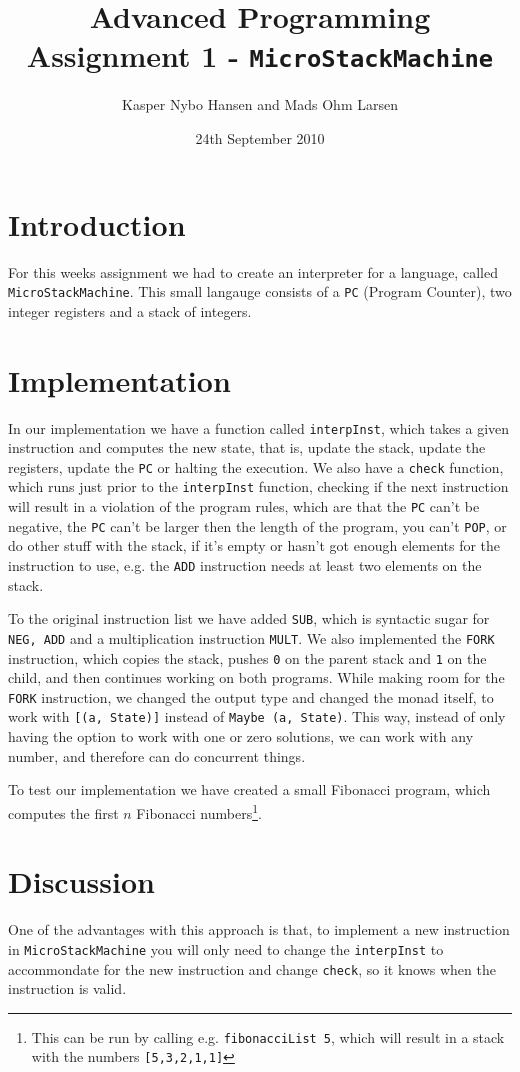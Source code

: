 \documentclass[10pt, a4paper]{article}
\title{Advanced Programming \\\small{Assignment 1} - \texttt{MicroStackMachine}}
\author{Kasper Nybo Hansen and Mads Ohm Larsen}
\date{24th September 2010}
\begin{document}
	
\maketitle
\section{Introduction}
For this weeks assignment we had to create an interpreter for a language, called \texttt{MicroStackMachine}.
This small langauge consists of a \texttt{PC} (Program Counter), two integer registers and a stack of integers.

\section{Implementation}
In our implementation we have a function called \texttt{interpInst}, which takes a given instruction and computes the new state, that is, update the stack, update the registers, update the \texttt{PC} or halting the execution.
We also have a \texttt{check} function, which runs just prior to the \texttt{interpInst} function, checking if the next instruction will result in a violation of the program rules, which are that the \texttt{PC} can't be negative, the \texttt{PC} can't be larger then the length of the program, you can't \texttt{POP}, or do other stuff with the stack, if it's empty or hasn't got enough elements for the instruction to use, e.g. the \texttt{ADD} instruction needs at least two elements on the stack.

To the original instruction list we have added \texttt{SUB}, which is syntactic sugar for \texttt{NEG, ADD} and a multiplication instruction \texttt{MULT}.
We also implemented the \texttt{FORK} instruction, which copies the stack, pushes \texttt{0} on the parent stack and \texttt{1} on the child, and then continues working on both programs. 
While making room for the \texttt{FORK} instruction, we changed the output type and changed the monad itself, to work with \texttt{[(a, State)]} instead of \texttt{Maybe (a, State)}. 
This way, instead of only having the option to work with one or zero solutions, we can work with any number, and therefore can do concurrent things.

To test our implementation we have created a small Fibonacci program, which computes the first $n$ Fibonacci numbers\footnote{This can be run by calling e.g. \texttt{fibonacciList 5}, which will result in a stack with the numbers \texttt{[5,3,2,1,1]}}.

\section{Discussion}
One of the advantages with this approach is that, to implement a new instruction in \texttt{MicroStackMachine} you will only need to change the \texttt{interpInst} to accommondate for the new instruction and change \texttt{check}, so it knows when the instruction is valid.
\end{document}
